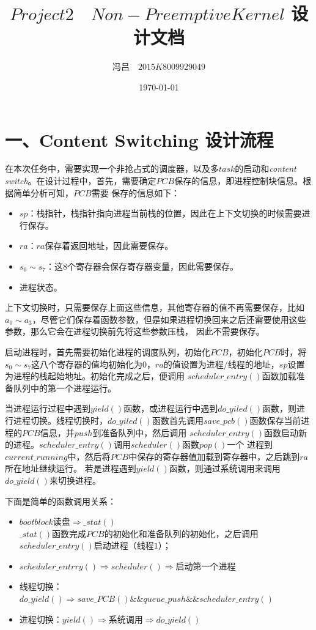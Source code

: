 \documentclass[UTF8,noindent]{ctexart}
\title{$Project2\quad Non-Preemptive Kernel$ 设计文档}
\author{冯吕$\quad 2015K8009929049$}
\date{\today}
\begin{document}
\maketitle
{}


\section*{一、Content Switching 设计流程}
在本次任务中，需要实现一个非抢占式的调度器，以及多$task$的启动和\emph{content 
switch}。在设计过程中，首先，需要确定$PCB$保存的信息，即进程控制块信息。根据简单分析可知，$PCB$需要
保存的信息如下：
\begin{itemize}
	\item $sp$：栈指针，栈指针指向进程当前栈的位置，因此在上下文切换的时候需要进行保存。
	\item $ra$：$ra$保存着返回地址，因此需要保存。
	\item $s_0 \sim s_7$：这$8$个寄存器会保存寄存器变量，因此需要保存。
	\item 进程状态。
\end{itemize}

上下文切换时，只需要保存上面这些信息，其他寄存器的值不再需要保存，比如$a_0 \sim 
a_3$，尽管它们保存着函数参数，但是如果进程切换回来之后还需要使用这些参数，那么它会在进程切换前先将这些参数压栈，
因此不需要保存。

启动进程时，首先需要初始化进程的调度队列，初始化$PCB$，初始化$PCB$时，将$s_0\sim 
s_7$这八个寄存器的值均初始化为$0$，$ra$的值设置为进程/线程的地址，$sp$设置为进程的栈起始地址。初始化完成之后，便调用
$scheduler\_entry()$函数加载准备队列中的第一个进程运行。

当进程运行过程中遇到$yield()$函数，或进程运行中遇到$do\_yiled()$函数，则进行进程切换。线程切换时，$
do\_yiled()$函数首先调用$save\_pcb()$函数保存当前进程的$PCB$信息，并$push$到准备队列中，然后调用
$scheduler\_entry()$函数启动新的进程。$scheduler\_entry()$调用$scheduler()$函数$pop()$一个
进程到$current\_running$中，然后将$PCB$中保存的寄存器值加载到寄存器中，之后跳到$ra$所在地址继续运行。
若是进程遇到$yield()$函数，则通过系统调用来调用$do\_yield()$来切换进程。

下面是简单的函数调用关系：
\begin{itemize}
	\item $bootblock\text{读盘}\Rightarrow \_stat()$\\
	$\_stat()$函数完成$PCB$的初始化和准备队列的初始化，之后调用$scheduler\_entry()$启动进程（线程$1$）；
	
	\item $scheduler\_entrry()\Rightarrow scheduler()\Rightarrow$启动第一个进程
	\item 线程切换：$do\_yield()\Rightarrow save\_PCB() \&\& queue\_push 
	\&\&scheduler\_entry()$
	\item 进程切换：$yield()\Rightarrow \text{系统调用}\Rightarrow do\_yield()$
\end{itemize}
\end{document}
